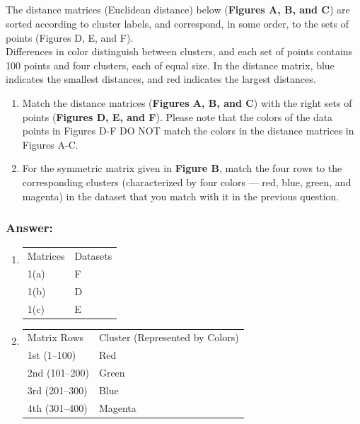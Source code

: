 \documentclass{article}
\begin{document}
\subsection{}

The distance matrices (Euclidean distance) below (\textbf{Figures A, B, and C}) are sorted according to cluster labels, and correspond, in some order, to the sets of points (Figures D, E, and F).
\\
Differences in color distinguish between clusters, and each set of points contains 100 points and four clusters, each of equal size. In the distance matrix, blue indicates the smallest distances, and red indicates the largest distances.

\begin{enumerate}[label= (\alph*)]
    \item Match the distance matrices (\textbf{Figures A, B, and C}) with the right sets of points (\textbf{Figures D, E, and F}). Please note that the colors of the data points in Figures D-F DO NOT match the colors in the distance matrices in Figures A-C.
    \item For the symmetric matrix given in \textbf{Figure B}, match the four rows to the corresponding clusters (characterized by four colors --- red, blue, green, and magenta) in the dataset that you match with it in the previous question.
\end{enumerate}

\subsubsection*{Answer:}
\begin{enumerate}[label= (\alph*)]
    \item \begin{table}[ht]
        \centering
        \begin{tabular}{ll}
        Matrices & Datasets \\
        1(a) & F \\
        1(b) & D \\
        1(c) & E
        \end{tabular}
    \end{table}
    \item     \begin{table}[ht]
        \centering
        \begin{tabular}{ll}
        Matrix Rows   & Cluster (Represented by Colors) \\
        1st (1--100)   & Red \\
        2nd (101--200) & Green \\
        3rd (201--300) & Blue \\
        4th (301--400) & Magenta
        \end{tabular}
    \end{table}
\end{enumerate}
\end{document}
